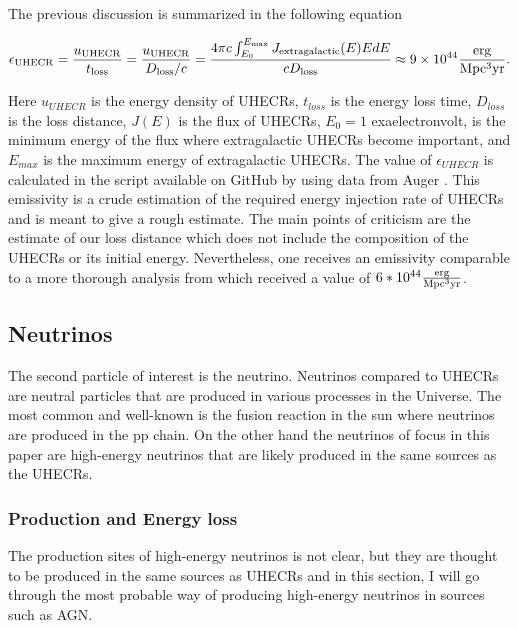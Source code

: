 The previous discussion is summarized in the following equation 

\begin{equation}
    \epsilon_{\rm UHECR} = \frac{u_{\rm UHECR}}{t_{\rm loss}} = \frac{u_{\rm UHECR}}{D_{\rm loss}/c} = \frac{4\pi c \int_{E_0}^{E_{\rm max}}J_{\rm extragalactic}(E)E dE}{c D_{\rm loss}} \approx 9\times 10^{44} \frac{\rm erg}{\rm Mpc^3 \rm yr}.
\end{equation}

Here $u_{UHECR}$ is the energy density of UHECRs, $t_{loss}$ is the energy loss time, $D_{loss}$ is the loss distance, $J(E)$ is the flux of UHECRs, $E_0 = 1$ exaelectronvolt, is the minimum energy of the flux where extragalactic UHECRs become important, and $E_{max}$ is the maximum energy of extragalactic UHECRs.
The value of $\epsilon_{UHECR}$ is calculated in the script available on GitHub \cite{Andrews_2023_github} by using data from  Auger \cite{thepierreaugercollaboration2017pierre}. This emissivity is a crude estimation of the required energy injection rate of UHECRs and is meant to give a rough estimate. 
The main points of criticism are the estimate of our loss distance which does not include the composition of the UHECRs or its initial energy. Nevertheless, one receives an emissivity comparable to a more thorough analysis from \cite{PhysRevLett.125.121106} which received a value of $6*10^{44} \frac{\rm erg}{\rm Mpc^3 \rm yr}$.




\subsection{Neutrinos}

The second particle of interest is the neutrino. Neutrinos compared to UHECRs are neutral particles that are produced in various processes in the Universe.
The most common and well-known is the fusion reaction in the sun where neutrinos are produced in the pp chain. On the other hand the neutrinos of focus in this paper 
are high-energy neutrinos that are likely produced in the same sources as the UHECRs.



\subsubsection{Production and Energy loss}
The production sites of high-energy neutrinos is not clear, but they are thought to be produced in the same sources as UHECRs 
and in this section, I will go through the most probable way of producing high-energy neutrinos in sources such as AGN.

